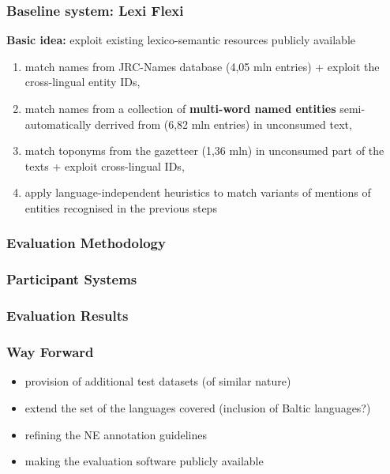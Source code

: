 \documentclass{beamer}
\begin{document}
\begin{frame}[fragile]
 \frametitle{Baseline system: Lexi Flexi}

\textbf{Basic idea:} exploit existing lexico-semantic resources publicly available

\begin{enumerate}

\item match names from {\color{red}JRC-Names} database (4,05 mln entries) + exploit the cross-lingual entity IDs,

\item match names from a collection of \textbf{multi-word named entities} semi-automatically derrived from {\color{red}{\sc Babelnet}} (6,82 mln entries) in unconsumed text,

\item match toponyms from the {\color{red}{\sc GeoNames}} gazetteer (1,36 mln) in unconsumed part of the texts + exploit cross-lingual IDs,

\item apply language-independent heuristics to match variants of mentions of entities recognised in the previous steps

\end{enumerate}

\end{frame}

\begin{frame}
 \frametitle{Evaluation Methodology}

\end{frame}


\begin{frame}
 \frametitle{Participant Systems}

\end{frame}

\begin{frame}
 \frametitle{Evaluation Results}

\end{frame}


\begin{frame}
 \frametitle{Way Forward}

\begin{itemize}

\item provision of additional test datasets (of similar nature)

\item extend the set of the languages covered (inclusion of Baltic languages?)

\item refining the NE annotation guidelines

\item making the evaluation software publicly available

\end{itemize}

\end{frame}
\end{document}
